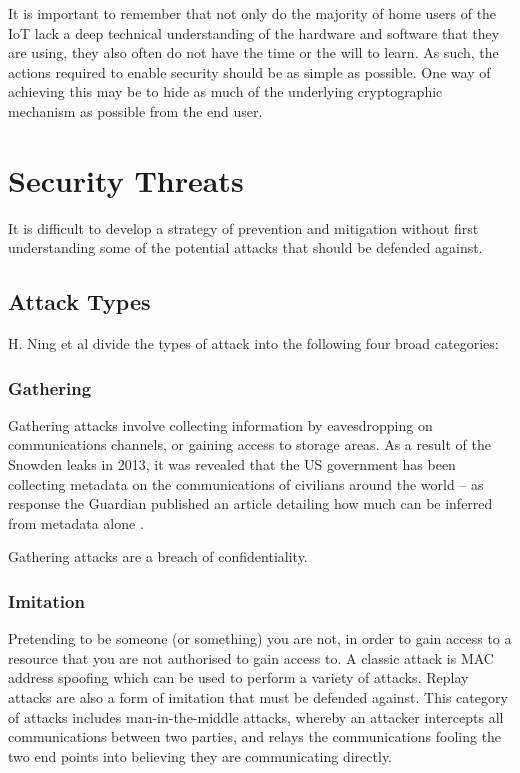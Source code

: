 \documentclass[10pt,journal,compsoc]{IEEEtran}
\begin{document}
It is important to remember that not only do the majority of home users of
the IoT lack a deep technical understanding of the hardware and software
that they are using, they also often do not have the time or the will to learn.
As such, the actions required to enable security should be as simple as
possible. One way of achieving this may be to hide as much of the underlying
cryptographic mechanism as possible from the end user.

\section{Security Threats}
It is difficult to develop a strategy of prevention and mitigation without
first understanding some of the potential attacks that should be defended
against.  

\subsection{Attack Types}
H. Ning et al \cite{Ning2013} divide the types of attack into the following
four broad categories:

\subsubsection{Gathering}
Gathering attacks involve collecting information by eavesdropping on
communications channels, or gaining access to storage areas. As a result of the
Snowden leaks in 2013, it was revealed that the US government has been
collecting metadata on the communications of civilians around the world -- as
response the Guardian published an article detailing how much can be inferred
from metadata alone \cite{Guardian2013}. 

Gathering attacks are a breach of confidentiality. 

\subsubsection{Imitation}
Pretending to be someone (or something) you are not, in order to gain access to
a resource that you are not authorised to gain access to. A classic attack is
MAC address spoofing which can be used to perform a variety of attacks. Replay
attacks are also a form of imitation that must be defended against. This
category of attacks includes man-in-the-middle attacks, whereby an attacker
intercepts all communications between two parties, and relays the
communications fooling the two end points into believing they are communicating
directly. 
\end{document}
